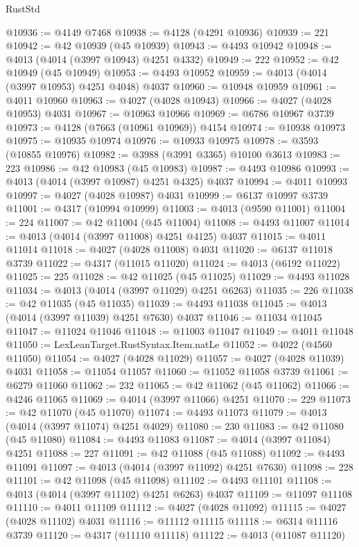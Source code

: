 \begin{lexlean}{RustStd}
\begin{coremodule}
@10936 := @4149 @7468
@10938 := @4128 (@4291 @10936)
@10939 := 221
@10942 := @42 @10939 (@45 @10939)
@10943 := @4493 @10942
@10948 := @4013 (@4014 (@3997 @10943) @4251 @4332)
@10949 := 222
@10952 := @42 @10949 (@45 @10949)
@10953 := @4493 @10952
@10959 := @4013 (@4014 (@3997 @10953) @4251 @4048) @4037
@10960 := @10948 @10959
@10961 := @4011 @10960
@10963 := @4027 (@4028 @10943)
@10966 := @4027 (@4028 @10953) @4031
@10967 := @10963 @10966
@10969 := @6786 @10967 @3739
@10973 := @4128 (@7663 (@10961 @10969)) @4154
@10974 := @10938 @10973
@10975 := @10935 @10974
@10976 := @10933 @10975
@10978 := @3593 (@10855 @10976)
@10982 := @3988 (@3991 @3365) @10100 @3613
@10983 := 223
@10986 := @42 @10983 (@45 @10983)
@10987 := @4493 @10986
@10993 := @4013 (@4014 (@3997 @10987) @4251 @4325) @4037
@10994 := @4011 @10993
@10997 := @4027 (@4028 @10987) @4031
@10999 := @6137 @10997 @3739
@11001 := @4317 (@10994 @10999)
@11003 := @4013 (@9590 @11001)
@11004 := 224
@11007 := @42 @11004 (@45 @11004)
@11008 := @4493 @11007
@11014 := @4013 (@4014 (@3997 @11008) @4251 @4125) @4037
@11015 := @4011 @11014
@11018 := @4027 (@4028 @11008) @4031
@11020 := @6137 @11018 @3739
@11022 := @4317 (@11015 @11020)
@11024 := @4013 (@6192 @11022)
@11025 := 225
@11028 := @42 @11025 (@45 @11025)
@11029 := @4493 @11028
@11034 := @4013 (@4014 (@3997 @11029) @4251 @6263)
@11035 := 226
@11038 := @42 @11035 (@45 @11035)
@11039 := @4493 @11038
@11045 := @4013 (@4014 (@3997 @11039) @4251 @7630) @4037
@11046 := @11034 @11045
@11047 := @11024 @11046
@11048 := @11003 @11047
@11049 := @4011 @11048
@11050 := LexLeanTarget.RustSyntax.Item.natLe
@11052 := @4022 (@4560 @11050)
@11054 := @4027 (@4028 @11029)
@11057 := @4027 (@4028 @11039) @4031
@11058 := @11054 @11057
@11060 := @11052 @11058 @3739
@11061 := @6279 @11060
@11062 := 232
@11065 := @42 @11062 (@45 @11062)
@11066 := @4246 @11065
@11069 := @4014 (@3997 @11066) @4251
@11070 := 229
@11073 := @42 @11070 (@45 @11070)
@11074 := @4493 @11073
@11079 := @4013 (@4014 (@3997 @11074) @4251 @4029)
@11080 := 230
@11083 := @42 @11080 (@45 @11080)
@11084 := @4493 @11083
@11087 := @4014 (@3997 @11084) @4251
@11088 := 227
@11091 := @42 @11088 (@45 @11088)
@11092 := @4493 @11091
@11097 := @4013 (@4014 (@3997 @11092) @4251 @7630)
@11098 := 228
@11101 := @42 @11098 (@45 @11098)
@11102 := @4493 @11101
@11108 := @4013 (@4014 (@3997 @11102) @4251 @6263) @4037
@11109 := @11097 @11108
@11110 := @4011 @11109
@11112 := @4027 (@4028 @11092)
@11115 := @4027 (@4028 @11102) @4031
@11116 := @11112 @11115
@11118 := @6314 @11116 @3739
@11120 := @4317 (@11110 @11118)
@11122 := @4013 (@11087 @11120)

\end{coremodule}
\end{lexlean}
